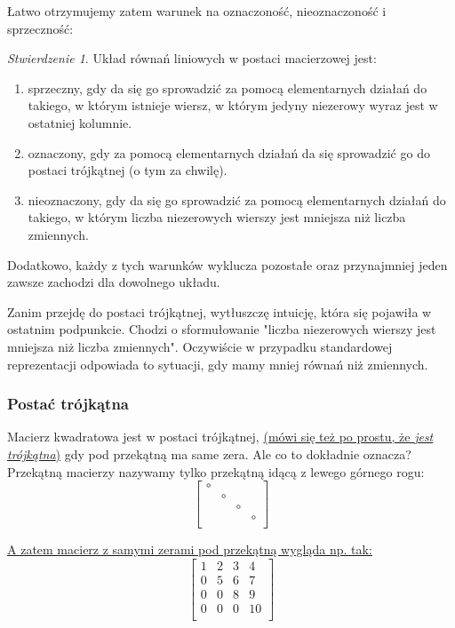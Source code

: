 \documentclass{article}
\theoremstyle{remark}
\newtheorem{lemma}{Stwierdzenie}[subsubsection]
\begin{document}
Łatwo otrzymujemy zatem warunek na oznaczoność, nieoznaczoność i sprzeczność:
\begin{lemma}
  Układ równań liniowych w postaci macierzowej jest:
  \begin{enumerate}
    \item sprzeczny, gdy da się go sprowadzić za pomocą elementarnych działań do takiego,
    w którym istnieje wiersz, w którym jedyny niezerowy wyraz jest w ostatniej kolumnie.
    \item oznaczony, gdy za pomocą elementarnych działań da się sprowadzić go do postaci
    trójkątnej (o tym za chwilę).
    \item nieoznaczony, gdy da się go sprowadzić za pomocą elementarnych działań do takiego,
    w którym liczba niezerowych wierszy jest mniejsza niż liczba zmiennych.
  \end{enumerate}
  Dodatkowo, każdy z tych warunków wyklucza pozostałe oraz przynajmniej
  jeden zawsze zachodzi dla dowolnego układu.
\end{lemma}
Zanim przejdę do postaci trójkątnej, wytłuszczę intuicję, która się pojawiła w ostatnim
podpunkcie. Chodzi o sformułowanie "liczba niezerowych wierszy jest mniejsza niż liczba zmiennych".
Oczywiście w przypadku standardowej reprezentacji odpowiada to sytuacji, gdy 
mamy mniej równań niż zmiennych.

\subsubsection{Postać trójkątna}
Macierz kwadratowa jest w postaci trójkątnej, \ul{(mówi się też po prostu, że }\textit{\ul{jest trójkątna}}\ul{)}
gdy pod przekątną ma same zera.
Ale co to dokładnie oznacza? Przekątną macierzy nazywamy tylko przekątną idącą z lewego górnego
rogu:
\[\left[
  \begin{array}{llll}
    \circ& && \\
    &\circ&&\\
    &&\circ&\\
    &&&\circ\\
  \end{array}
\right]\]

\ul{A zatem macierz z samymi zerami pod przekątną wygląda np. tak:}
\[\left[
  \begin{array}{llll}
    1&2 &3&4 \\
    0&5&6&7\\
    0&0&8&9\\
    0&0&0&10\\
  \end{array}
\right]\]
\end{document}
